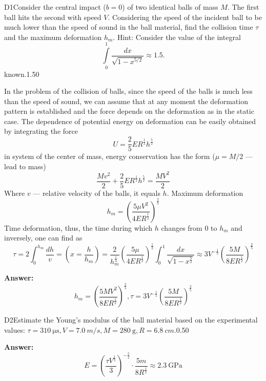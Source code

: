 \documentclass[11pt,a4paper]{article}
\begin{document}
\begin{solcard}{D1}{Consider the central impact ($b=0$) of two identical balls of mass $M$. The first ball hits the second with speed $V$. Considering the speed of the incident ball to be much lower than the speed of sound in the ball material, find the collision time $\tau$ and the maximum deformation $h_m$. Hint: Consider the value of the integral $$\int\limits_0^1\frac{dx}{\sqrt{1-x^{5/2}}}\approx 1.5.$$ known.}{1.50}

In the problem of the collision of balls, since the speed of the balls is much less than the speed of sound, we can assume that at any moment the deformation pattern is established and the force depends on the deformation as in the static case. The dependence of potential energy on deformation can be easily obtained by integrating the force $$ U=\frac{2}{5} E R^{\frac{1}{2}} h^{\frac{5}{2}} $$ in system of the center of mass, energy conservation has the form ($\mu=M/2$ — lead to mass) $$ \frac{M v^{2}}{2}+\frac{2}{5} E R^{\frac{1}{2}} h^{\frac{5}{2}}=\frac{M V^{2}}{2} $$ Where $v$ — relative velocity of the balls, it equals $\dot h$. Maximum deformation $$ h_{m}=\left(\frac{5 \mu V^{2}}{4 E R^{\frac{1}{2}}}\right)^{\frac{2}{5}} $$ Time deformation, thus, the time during which $h$ changes from 0 to $h_m$ and inversely, one can find as $$ \tau=2 \int_{0}^{h_{m}} \frac{d h}{v}=\left(x=\frac{h}{h_{m}}\right)=\frac{2}{h_{m}^{\frac{1}{4}}}\left(\frac{5 \mu}{4 E R^{\frac{1}{2}}}\right)^{\frac{1}{2}} \int_{0}^{1} \frac{d x}{\sqrt{1-x^{\frac{5}{2}}}} \approx 3 V^{-\frac{1}{5}}\left(\frac{5 M}{8 E R^{\frac{1}{2}}}\right)^{\frac{2}{5}} $$

\par\smallskip\noindent\textbf{Answer:} $$ h_{m}=\left(\frac{5 M V^{2}}{8 E R^{\frac{1}{2}}}\right)^{\frac{2}{5}}, \tau=3 V^{-\frac{1}{5}}\left(\frac{5 M}{8 E R^{\frac{1}{2}}}\right)^{\frac{2}{5}} $$
\end{solcard}

\begin{solcard}{D2}{Estimate the Young's modulus of the ball material based on the experimental values: $\tau=310~\mathrm{\mu s}, V=7.0~m/s, M=280~\mathrm{g}, R=6.8~cm$.}{0.50}
\par\smallskip\noindent\textbf{Answer:} $$ E=\left(\frac{\tau V^{\frac{1}{5}}}{3}\right)^{-\frac{5}{2}} \cdot \frac{5 m}{8 R^{\frac{1}{2}}} \approx 2.3~\mathrm{GPa} $$
\end{solcard}
\end{document}
